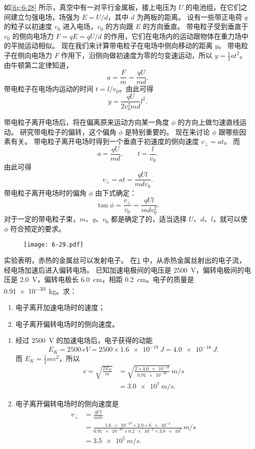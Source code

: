 如\cref{fig:6-28} 所示，真空中有一对平行金属板，接上电压为 $U$ 的电池组，在它们之间建立匀强电场，场强为 $E=U/d$，其中 $d$ 为两板的距离。
设有一些带正电荷 $q$ 的粒子以初速度 $v_0$ 进入电场，$v_0$ 的方向跟 $E$ 的方向垂直。
带电粒子受到垂直于 $v_0$ 的侧向电场力 $F=qE=qU/d$ 的作用，它们在电场内的运动跟物体在重力场中的平抛运动相似。
现在我们来计算带电粒子在电场中侧向移动的距离 $y$。
带电粒子在侧向电场力 $F$ 作用下，沿侧向做初速度为零的匀变速运动，所以 $y=\frac{1}{2}at^2$。
由牛顿第二定律知道，
\[a=\frac{F}{m}=\frac{qU}{md}.\]
带电粒子在电场内运动的时间 $t=l/v_0$。由此可得
\[y=\frac{qU}{2v^2_0 md}l^2.\]

带电粒子离开电场后，将在偏离原来运动方向某一角度 $\phi$ 的方向上做匀速直线运动。
研究带电粒子的偏转，这个偏角 $\phi$ 是特别重要的。
现在来讨论 $\phi$ 跟哪些因素有关。
带电粒子离开电场时得到一个垂直于初速度的侧向速度 $v_{\perp}=at$。
而
\[a=\frac{qU}{md},\qquad t=\frac{l}{v_0}.\]
由此可得
\[v_{\perp}=at=\frac{qUl}{mdv_0}.\]
带电粒子离开电场时的偏角 $\phi$ 由下式确定：
\[\tan\phi=\frac{v_{\bot}}{v_0}=\frac{qUl}{mdv^2_0}.\]
对于一定的带电粒子束，$m$、$q$、$v_0$ 都是确定了的，适当选择 $U$、$d$、$l$，就可以使 $\phi$ 符合预定的要求。

\begin{example}
\begin{figure}
	\texttt{[image: 6-29.pdf]}
	\caption{}\label{fig:6-29}
\end{figure}

实验表明，赤热的金属丝可以发射电子。
在\cref{fig:6-29} 中，从赤热金属丝射出的电子流，经电场加速后进入偏转电场。
已知加速电极间的电压是 \qty{2500}{V}，偏转电极间的电压是 \qty{2.0}{V}，偏转电极长 \qty{6.0}{cm}，相距 \qty{0.2}{cm}。电子的质量是 \qty{0.91e-30}{kg}。求：
\begin{enumerate}
	\item 电子离开加速电场时的速度；
	\item 电子离开偏转电场时的侧向速度。
\end{enumerate}
\end{example}

\begin{solution}
	\begin{enumerate}
\item 经过 \qty{2500}{V} 的加速电场后，电子获得的动能
\[E_K=\qty{2500}{eV}=2500\times\qty{1.6e-19}{J}=\qty{4.0e-16}{J}.\]
而 $E_K=\frac{1}{2}mv^2$，所以
\[\begin{split}
	v=\sqrt{\frac{2E_K}{m}}&=\sqrt{\frac{2\times \num{4.0e-18}}{\num{0.91e-30}}}\,\unit{m/s}\\
	&=\qty{3.0e7}{m/s}.
\end{split} \]	

\item 电子离开偏转电场时的侧向速度是
\[\begin{split}
	v_{\bot}&=\frac{qUl}{mdv}\\
	&=\frac{\num{1.6e-19}\times2.0\times\num{6e-2}}{\num{0.91e-30}\times \num{0.2e-2}\times\num{3.0e7}} \,\unit{m/s}\\
	&=\qty{3.5e5}{m/s}.
\end{split} \]	
\end{enumerate}
\end{solution}

